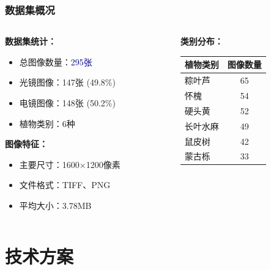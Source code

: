 \documentclass[10pt]{beamer}
\begin{document}
\begin{frame}
\frametitle{数据集概况}
\begin{columns}
\begin{column}{0.5\textwidth}
\textbf{数据集统计：}
\begin{itemize}
    \item 总图像数量：\textcolor{darkblue}{295张}
    \item 光镜图像：147张 (49.8\%)
    \item 电镜图像：148张 (50.2\%)
    \item 植物类别：6种
\end{itemize}

\vspace{0.3cm}
\textbf{图像特征：}
\begin{itemize}
    \item 主要尺寸：1600×1200像素
    \item 文件格式：TIFF、PNG
    \item 平均大小：3.78MB
\end{itemize}
\end{column}

\begin{column}{0.5\textwidth}
\textbf{类别分布：}
\begin{table}[h]
\centering
\small
\begin{tabular}{lc}
\toprule
\textbf{植物类别} & \textbf{图像数量} \\
\midrule
粽叶芦 & 65 \\
怀槐 & 54 \\
硬头黄 & 52 \\
长叶水麻 & 49 \\
鼠皮树 & 42 \\
蒙古栎 & 33 \\
\bottomrule
\end{tabular}
\end{table}
\end{column}
\end{columns}
\end{frame}

\section{技术方案}
\end{document}
